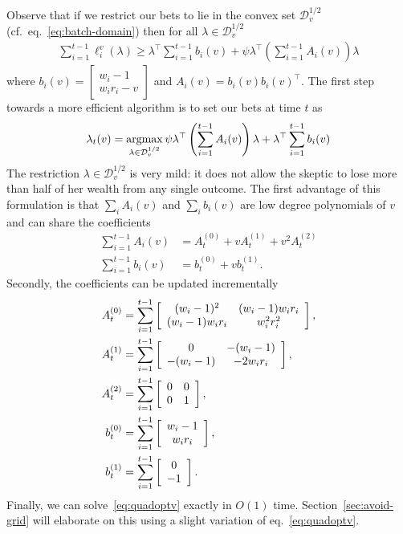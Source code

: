 Observe that if we restrict our bets to lie in the convex set
$\mathcal{D}_v^{1/2}$ (cf.~eq.~\eqref{eq:batch-domain}) then for all $\lambda
\in \mathcal{D}_v^{1/2}$
\begin{align*}
\sum_{i=1}^{t-1} \ell_i^v(\lambda) 
\geq
\lambda^\top \sum_{i=1}^{t-1} b_i(v) 
+\psi \lambda^\top \left(\sum_{i=1}^{t-1} A_i(v)\right) \lambda
\end{align*}
where 
$b_i(v)=
\left[\begin{array}{c} 
w_i-1 \\ w_i r_i -v 
\end{array}\right] 
$
and 
$
A_i(v) = b_i(v)b_i(v)^\top.
$
The first step towards a more efficient algorithm is to set our bets at time
$t$ as
\begin{equation}
\lambda_t(v) = \operatorname*{argmax}_{\lambda \in \mathcal{D}_{v}^{1/2}}
\psi  \lambda^\top \left(\sum_{i=1}^{t-1} A_i(v)\right) \lambda 
+ \lambda^\top \sum_{i=1}^{t-1} b_i(v)
\label{eq:quadoptv}
\end{equation}
The restriction $\lambda \in \mathcal{D}_{v}^{1/2}$ is very mild: it does not
allow the skeptic to lose more than half of
her wealth from any single outcome.  The first advantage of this formulation is
that $\sum_i A_i(v)$ and $\sum_i b_i(v)$ are low degree polynomials of $v$ and
can share the coefficients
    \begin{align*}
        \sum_{i=1}^{t-1} A_i(v) &= 
        A_t^{(0)} + v A_t^{(1)} + v^2 A_t^{(2)}\\   
        \sum_{i=1}^{t-1} b_i(v) &= b_t^{(0)} + v b_t^{(1)}.  
    \end{align*}
Secondly, the coefficients can be updated incrementally
\allowdisplaybreaks
    \begin{align}
        A_t^{(0)} &=\sum_{i=1}^{t-1}\left[\begin{array}{cc} (w_i-1)^2 & (w_i-1)w_i r_i \\ (w_i-1)w_i r_i & w_i^2r_i^2 \end{array}\right], \label{eq:upsuffa0}\\
        A_t^{(1)} &= \sum_{i=1}^{t-1} \left[\begin{array}{cc} 0 & -(w_i-1) \\ -(w_i-1) & -2w_ir_i \end{array}\right],\\
        A_t^{(2)} &=\sum_{i=1}^{t-1}  \left[\begin{array}{cc} 0 & 0 \\ 0 & 1 \end{array}\right],\\
        b_t^{(0)} &=\sum_{i=1}^{t-1}  \left[\begin{array}{c} w_i-1 \\ w_ir_i \end{array}\right],\\
        b_t^{(1)} &=\sum_{i=1}^{t-1}  \left[\begin{array}{c} 0 \\ -1 \end{array}\right]. \label{eq:upsuffb1}
    \end{align}
Finally, we can solve~\eqref{eq:quadoptv} exactly in $O(1)$ time.
Section~\ref{sec:avoid-grid} will elaborate on this using a slight variation of
eq.~\eqref{eq:quadoptv}.

